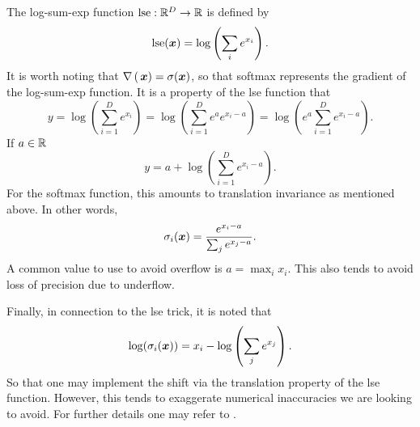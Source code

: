  The log-sum-exp function \(\operatorname{lse}:\mathbb R^D\rightarrow\mathbb R\) is defined by 
 \[\operatorname{lse}(\bm x) = \log\left(\sum_i e^{x_i}\right).\]
 It is worth noting that \(\nabla\operatorname{(}\bm x) = \sigma(\bm x)\), so that softmax 
 represents the gradient of the log-sum-exp function.  It is a property of the 
 lse function that 
 \[y = \log\left(\sum_{i=1}^{D} e^{x_i}\right) = \log\left(\sum_{i=1}^{D} e^a
 e^{x_i-a}\right) = \log\left(e^a\sum_{i=1}^{D} e^{x_i-a}\right).\]
 If \(a\in\mathbb R\)
 \[y = a + \log\left(\sum_{i=1}^{D} e^{x_i-a}\right).\]
 For the softmax function, this amounts to translation invariance as mentioned 
 above.  In other words,
\[\sigma_i(\bm x) = \frac{e^{x_i-a}}{\sum_{j} e^{x_j-a}}.\]
A common value to use to avoid overflow is \(a =\max_i x_i\). This also tends 
to avoid loss of precision due to underflow.

Finally, in connection to the lse trick, it is noted that 
\[\log(\sigma_i(\bm x)) = x_i - \log\left(\sum_j e^{x_j}\right).\]
So that one may implement the shift via the translation property of the lse 
function.  However, this tends to exaggerate numerical inaccuracies we are looking 
to avoid. For further details one may refer to \cite{AccurateSoftmax}.

%
%
%
